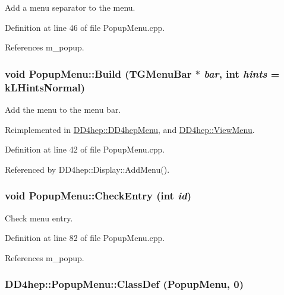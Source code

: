 Add a menu separator to the menu. 

Definition at line 46 of file PopupMenu.cpp.

References m\_\-popup.\hypertarget{class_d_d4hep_1_1_popup_menu_a896a1626d79fd3d6ccb1c1e0657cf1ae}{
\subsubsection[{Build}]{\setlength{\rightskip}{0pt plus 5cm}void PopupMenu::Build (TGMenuBar $\ast$ {\em bar}, \/  int {\em hints} = {\ttfamily kLHintsNormal})}}
\label{class_d_d4hep_1_1_popup_menu_a896a1626d79fd3d6ccb1c1e0657cf1ae}


Add the menu to the menu bar. 

Reimplemented in \hyperlink{class_d_d4hep_1_1_d_d4hep_menu_a85d08c3fd89b740586c592797e780607}{DD4hep::DD4hepMenu}, and \hyperlink{class_d_d4hep_1_1_view_menu_abd9d63ee3f3ca7b16a646b29e41a855c}{DD4hep::ViewMenu}.

Definition at line 42 of file PopupMenu.cpp.

Referenced by DD4hep::Display::AddMenu().\hypertarget{class_d_d4hep_1_1_popup_menu_aacbb6570c064253d647ef4129a0bc7c8}{
\subsubsection[{CheckEntry}]{\setlength{\rightskip}{0pt plus 5cm}void PopupMenu::CheckEntry (int {\em id})}}
\label{class_d_d4hep_1_1_popup_menu_aacbb6570c064253d647ef4129a0bc7c8}


Check menu entry. 

Definition at line 82 of file PopupMenu.cpp.

References m\_\-popup.\hypertarget{class_d_d4hep_1_1_popup_menu_a8ffb8033e698baa49a05c79c66e0f5c2}{
\subsubsection[{ClassDef}]{\setlength{\rightskip}{0pt plus 5cm}DD4hep::PopupMenu::ClassDef ({\bf PopupMenu}, \/  0)}}
\label{class_d_d4hep_1_1_popup_menu_a8ffb8033e698baa49a05c79c66e0f5c2}


